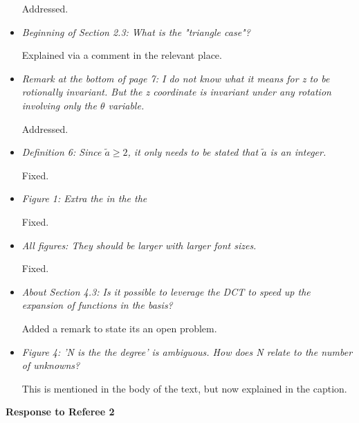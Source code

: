 \documentclass[10pt]{letter}
\newcommand{\comment}[1]{\textit{\color{bluey}#1}}
\begin{document}
\begin{itemize}[parsep=1em,leftmargin=1em]
Addressed.


\item \comment{Beginning of Section 2.3: What is the "triangle case"?}

Explained via a comment in the relevant place.


\item \comment{Remark at the bottom of page 7: I do not know what it means for z to be rotionally invariant. But the z coordinate is invariant under any rotation involving only the $\theta$ variable.}

Addressed.


\item \comment{Definition 6: Since $\tilde a \ge 2$, it only needs to be stated that $\tilde a$ is an integer.}

Fixed.


\item \comment{Figure 1: Extra the in the the}

Fixed.


\item \comment{All figures: They should be larger with larger font sizes.}

Fixed.


\item \comment{About Section 4.3: Is it possible to leverage the DCT to speed up the expansion of functions in the basis?}

Added a remark to state its an open problem.


\item \comment{Figure 4: 'N is the the degree' is ambiguous. How does N relate to the number of unknowns?}

This is mentioned in the body of the text, but now explained in the caption.


\end{itemize}




\bigskip 

\centerline{\textbf{Response to Referee 2}}
\end{document}

